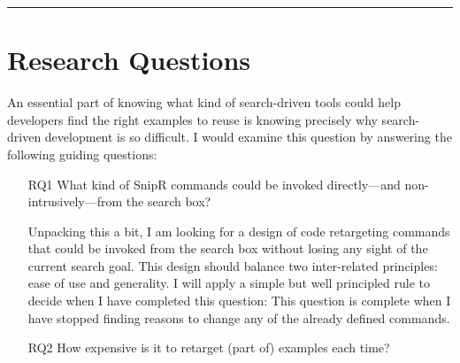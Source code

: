 \fancybreak{\pfbreakdisplay}

\section{Research Questions}
\label{sec:questions}

An essential part of knowing what kind of search-driven tools could help developers find the right examples to reuse is knowing precisely why search-driven development is so difficult. I would examine this question by answering the following guiding questions: 

\begin{itemize}
	
	\item[RQ1] What kind of SnipR commands could be invoked directly---and 
	non-intrusively---from the search box? 
	
	Unpacking this a bit, I am looking for a design of code retargeting commands that 
	could be invoked from the search box without losing any sight of the current 
	search goal. This design should balance two inter-related principles: ease of use and 
	generality. I will apply a simple but well principled rule to decide when I have completed this question: 
	This question is complete when I have stopped finding reasons to change any of the already defined commands.
		
	\item[RQ2] How expensive is it to retarget (part of) examples each time?
	

\end{itemize}
